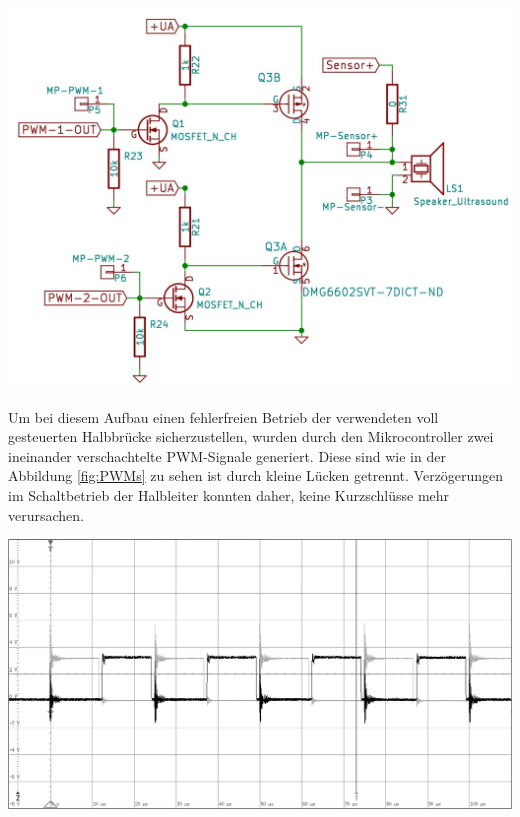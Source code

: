 \begin{center}
\begin{minipage}{0.75\textwidth}
\includegraphics[width=1\textwidth%
]{Abbildungen/halbbrucke.png}
\label{fig:halbbrücke}
\end{minipage}
\end{center}
Um bei diesem Aufbau einen fehlerfreien Betrieb der verwendeten voll gesteuerten Halbbrücke sicherzustellen, wurden durch den Mikrocontroller zwei ineinander verschachtelte PWM-Signale generiert. Diese sind wie in der Abbildung \ref{fig:PWMs} zu sehen ist durch kleine Lücken getrennt. Verzögerungen im Schaltbetrieb der Halbleiter konnten daher, keine Kurzschlüsse mehr verursachen.\\
\begin{center}
\begin{minipage}{0.75\textwidth}
\includegraphics[width=1\textwidth%
]{Abbildungen/MessungenP2/Zwei_PWMs_von_der_CPU.PNG}
\label{fig:PWMs}
\end{minipage}\\
\end{center}
